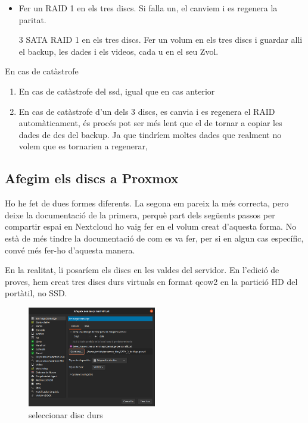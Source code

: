 \documentclass[
  10pt,
]{krantz}
\providecommand{\tightlist}{%
  \setlength{\itemsep}{0pt}\setlength{\parskip}{0pt}}
\begin{document}
\begin{itemize}
\item
  Fer un RAID 1 en els tres discs. Si falla un, el canviem i es regenera la paritat.

  3 SATA RAID 1 en els tres discs. Fer un volum en els tres discs i guardar alli el backup, les dades i els videos, cada u en el seu Zvol.
\end{itemize}

En cas de catàstrofe

\begin{enumerate}
\def\labelenumi{\arabic{enumi}.}
\tightlist
\item
  En cas de catàstrofe del ssd, igual que en cas anterior
\item
  En cas de catàstrofe d'un dels 3 discs, es canvia i es regenera el RAID automàticament, és procés pot ser més lent que el de tornar a copiar les dades de des del backup. Ja que tindríem moltes dades que realment no volem que es tornarien a regenerar,
\end{enumerate}

\hypertarget{afegim-els-discs-a-proxmox}{%
\subsection{Afegim els discs a Proxmox}\label{afegim-els-discs-a-proxmox}}

Ho he fet de dues formes diferents. La segona em pareix la més correcta, pero deixe la documentació de la primera, perquè part dels següents passos per compartir espai en Nextcloud ho vaig fer en el volum creat d'aquesta forma. No està de més tindre la documentació de com es va fer, per si en algun cas específic, convé més fer-ho d'aquesta manera.

En la realitat, li posaríem els discs en les valdes del servidor. En l'edició de proves, hem creat tres discs durs virtuals en format qcow2 en la partició HD del portàtil, no SSD.

\begin{figure}
\centering
\includegraphics[width=0.5\textwidth,height=\textheight]{imatges/proxmox/Afegir_disc_pro1.png}
\caption{seleccionar disc durs}
\end{figure}
\end{document}
